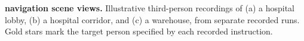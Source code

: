 \textbf{navigation scene views.}
Illustrative third-person recordings of (a) a hospital lobby,
(b) a hospital corridor, and (c) a warehouse, from separate recorded runs.
Gold stars mark the target person specified by each recorded instruction.
